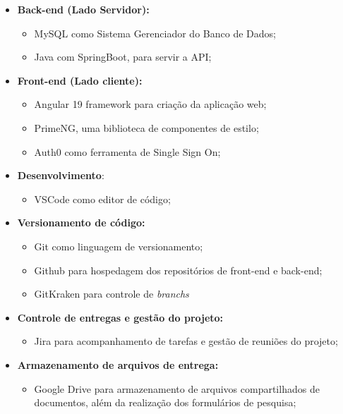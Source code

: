 \documentclass[
	article,			%
	12pt,				%
	oneside,			%
	a4paper,			%
    BIBLATEX,           %
	english,			%
	brazil,				%
	sumario=tradicional
	]{abntex2}
\begin{document}
\begin{itemize}
    \item \textbf{Back-end (Lado Servidor):}
        \begin{itemize}
            \item MySQL como Sistema Gerenciador do Banco de Dados;
            \item Java com SpringBoot, para servir a API;
        \end{itemize}
        
    \item \textbf{Front-end (Lado cliente):}
        \begin{itemize}
            \item Angular 19 framework para criação da aplicação web;
            \item PrimeNG, uma biblioteca de componentes de estilo;
            \item Auth0 como ferramenta de Single Sign On;
        \end{itemize}

    \item \textbf{Desenvolvimento}:
        \begin{itemize}
            \item VSCode como editor de código;
        \end{itemize}

    \item \textbf{Versionamento de código: }
        \begin{itemize}
            \item Git como linguagem de versionamento;
            \item Github para hospedagem dos repositórios de front-end e back-end;
            \item GitKraken para controle de \textit{branchs}
        \end{itemize}
        
    \item \textbf{Controle de entregas e gestão do projeto: }
        \begin{itemize}
            \item Jira para acompanhamento de tarefas e gestão de reuniões do projeto;
        \end{itemize}
        
    \item \textbf{Armazenamento de arquivos de entrega:}
        \begin{itemize}
            \item Google Drive para armazenamento de arquivos compartilhados de documentos, além da realização dos formulários de pesquisa;
        \end{itemize}

\end{itemize}
	
\end{document}
